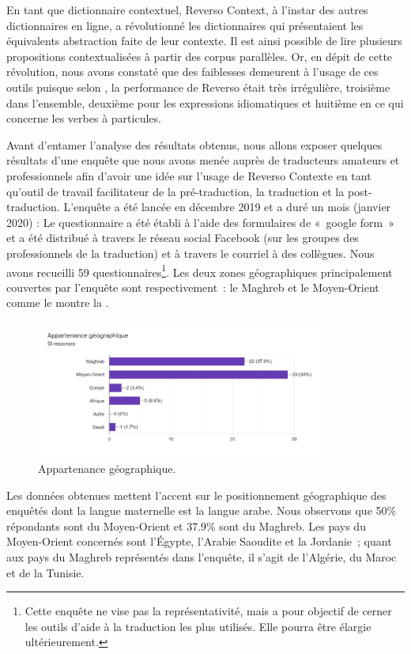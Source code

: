 \documentclass{textolivre}
\begin{document}
En tant que dictionnaire contextuel, Reverso Context, à l’instar des autres dictionnaires en ligne, a révolutionné les dictionnaires qui présentaient les équivalents abstraction faite de leur contexte. Il est ainsi possible de lire plusieurs propositions contextualisées à partir des corpus parallèles. Or, en dépit de cette révolution, nous avons constaté que des faiblesses demeurent à l’usage de ces outils puisque selon \textcite[p. 16]{yen2013}, la performance de Reverso était très irrégulière, troisième dans l’ensemble, deuxième pour les expressions idiomatiques et huitième en ce qui concerne les verbes à particules.

Avant d’entamer l’analyse des résultats obtenus, nous allons exposer quelques résultats d’une enquête que nous avons menée auprès de traducteurs amateurs et professionnels afin d’avoir une idée sur l’usage de Reverso Contexte en tant qu’outil de travail facilitateur de la pré-traduction, la traduction et  la post-traduction. L’enquête a été lancée en décembre 2019 et a duré un mois (janvier 2020) :  Le questionnaire a été établi à l’aide des formulaires de « google form » et a été distribué à travers le réseau social Facebook (sur les groupes des professionnels de la traduction) et à travers le courriel à des collègues. Nous avons recueilli 59 questionnaires\footnote{
Cette enquête ne vise pas la représentativité, mais a pour objectif de cerner les outils d’aide à la traduction les plus utilisés. Elle pourra être élargie ultérieurement.
}. Les deux zones géographiques principalement couvertes par l’enquête sont respectivement : le Maghreb et le Moyen-Orient comme le montre la .

\begin{figure}[htbp]
 \centering
 \includegraphics[width=0.85\textwidth]{figure01.pdf}
 \caption{Appartenance géographique.}
 \label{fig-01}
\end{figure}

Les données obtenues mettent l’accent sur le positionnement géographique des enquêtés dont la langue maternelle est la langue arabe. Nous observons que 50\% répondants sont du Moyen-Orient et 37.9\% sont du Maghreb. Les pays du Moyen-Orient concernés sont l’Égypte, l’Arabie Saoudite et la Jordanie ; quant aux pays du Maghreb représentés dans l’enquête, il s’agit de l’Algérie, du Maroc et de la Tunisie.
\end{document}
